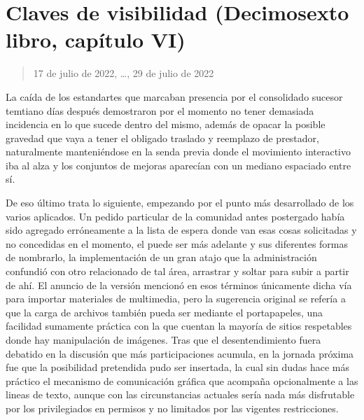 \documentclass[
]{book}
\begin{document}
\hypertarget{claves-de-visibilidad-decimosexto-libro-capuxedtulo-vi}{%
\section{Claves de visibilidad (Decimosexto libro, capítulo VI)}\label{claves-de-visibilidad-decimosexto-libro-capuxedtulo-vi}}

\begin{quote}
17 de julio de 2022, \ldots, 29 de julio de 2022
\end{quote}

La caída de los estandartes que marcaban presencia por el consolidado sucesor temtiano días después demostraron por el momento no tener demasiada incidencia en lo que sucede dentro del mismo, además de opacar la posible gravedad que vaya a tener el obligado traslado y reemplazo de prestador, naturalmente manteniéndose en la senda previa donde el movimiento interactivo iba al alza y los conjuntos de mejoras aparecían con un mediano espaciado entre sí.

De eso último trata lo siguiente, empezando por el punto más desarrollado de los varios aplicados. Un pedido particular de la comunidad antes postergado había sido agregado erróneamente a la lista de espera donde van esas cosas solicitadas y no concedidas en el momento, el puede ser más adelante y sus diferentes formas de nombrarlo, la implementación de un gran atajo que la administración confundió con otro relacionado de tal área, arrastrar y soltar para subir a partir de ahí. El anuncio de la versión mencionó en esos términos únicamente dicha vía para importar materiales de multimedia, pero la sugerencia original se refería a que la carga de archivos también pueda ser mediante el portapapeles, una facilidad sumamente práctica con la que cuentan la mayoría de sitios respetables donde hay manipulación de imágenes. Tras que el desentendimiento fuera debatido en la discusión que más participaciones acumula, en la jornada próxima fue que la posibilidad pretendida pudo ser insertada, la cual sin dudas hace más práctico el mecanismo de comunicación gráfica que acompaña opcionalmente a las lineas de texto, aunque con las circunstancias actuales sería nada más disfrutable por los privilegiados en permisos y no limitados por las vigentes restricciones.
\end{document}
